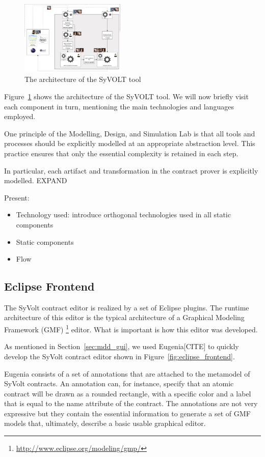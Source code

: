 \begin{figure}
\centering
\includegraphics[width=0.45\textwidth]{figures/syvolt_arch}
\caption{The architecture of the SyVOLT tool}
\label{fig:arch}
\end{figure}

Figure~\ref{fig:arch} shows the architecture of the SyVOLT tool. We will now briefly visit each component in turn, mentioning the main technologies and languages employed.


One principle of the Modelling, Design, and Simulation Lab is that all tools and processes should be explicitly modelled at an appropriate abstraction level. This practice ensures that only the essential complexity is retained in each step.

In particular, each artifact and transformation in the contract prover is explicitly modelled. EXPAND

Present:
\begin{itemize}
  \item Technology used: introduce orthogonal technologies used in all
  static components
  \item Static components
  \item Flow
\end{itemize}


\subsection{Eclipse Frontend}

The SyVolt contract editor is realized by a set of Eclipse plugins.
The runtime architecture of this editor is the typical architecture of a Graphical Modeling Framework (GMF) \footnote{\url{http://www.eclipse.org/modeling/gmp/}} editor. 
What is important is how this editor was developed.

As mentioned in Section~\ref{sec:mdd_gui}, we used Eugenia[CITE] to quickly develop the SyVolt contract editor shown in Figure~\ref{fig:eclipse_frontend}.

Eugenia consists of a set of annotations that are attached to the metamodel of
SyVolt contracts. An annotation can, for instance, specify that an atomic contract will be drawn as a rounded rectangle, with a specific color and a label that is equal to the name attribute of the contract.
The annotations are not very expressive but they contain the essential information to generate a set of GMF models that, ultimately, describe a basic usable graphical editor. 

